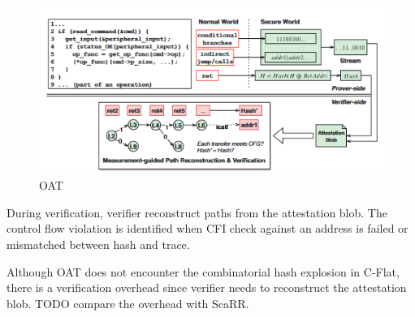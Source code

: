 \begin{figure}[htbp]
\centerline{\includegraphics[scale=.5]{Figures/01/oat.png}}
\caption{OAT}
\label{fig:oat}
\end{figure}

During verification, verifier reconstruct paths from the attestation blob. The control flow violation is identified when CFI check against an address is failed or mismatched between hash and trace.

Although OAT does not encounter the combinatorial hash explosion in C-Flat, there is a verification overhead since verifier needs to reconstruct the attestation blob. TODO compare the overhead with ScaRR.
